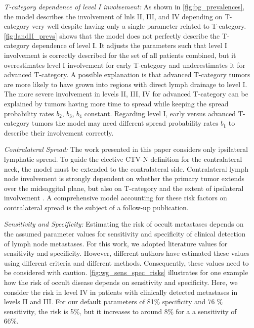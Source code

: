\documentclass[twocolumn]{article}
\begin{document}
{\it T-category dependence of level I involvement:} As shown in \cref{fig:bg_prevalences}, the model describes the involvement of \glspl{lnl} II, III, and IV depending on T-category very well despite having only a single parameter related to T-category. \cref{fig:IandII_prevs} shows that the model does not perfectly describe the T-category dependence of level I. It adjusts the parameters such that level I involvement is correctly described for the set of all patients combined, but it overestimates level I involvement for early T-category and underestimates it for advanced T-category. A possible explanation is that advanced T-category tumors are more likely to have grown into regions with direct lymph drainage to level I. The more severe involvement in levels II, III, IV for advanced T-category can be explained by tumors having more time to spread while keeping the spread probability rates $b_2$, $b_3$, $b_4$ constant. Regarding level I, early versus advanced T-category tumors the model may need different spread probability rates $b_1$ to describe their involvement correctly.

{\it Contralateral Spread:} The work presented in this paper considers only ipsilateral lymphatic spread. To guide the elective CTV-N definition for the contralateral neck, the model must be extended to the contralateral side. Contralateral lymph node involvement is strongly dependent on whether the primary tumor extends over the midsaggital plane, but also on T-category and the extent of ipsilateral involvement \cite{ludwig_detailed_2022}. A comprehensive model accounting for these risk factors on contralateral spread is the subject of a follow-up publication.

{\it Sensitivity and Specificity:} Estimating the risk of occult metastases depends on the assumed parameter values for sensitivity and specificity of clinical detection of lymph node metastases. For this work, we adopted literature values for sensitivity and specificity. However, different authors have estimated these values using different criteria and different methods. Consequently, these values need to be considered with caution. \cref{fig:wg_sens_spec_risks} illustrates for one example how the risk of occult disease depends on sensitivity and specificity. Here, we consider the risk in level IV in patients with clinically detected metastases in levels II and III. For our default parameters of 81\% specificity and 76 \% sensitivity, the risk is 5\%, but it increases to around 8\% for a a sensitivity of 66\%.
\end{document}
